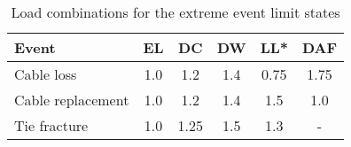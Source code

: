 \begin{table}[H]
\caption{Load combinations for the extreme event limit states}
\label{tab:extreme_combination}
\centering
\begin{tabular}{lccccc}
\hline
Event         & EL  & DC         & DW         & LL*   & DAF  \\ \hline
Cable loss   & 1.0 & 1.2 & 1.4 & 0.75 & 1.75   \\
Cable replacement & 1.0 & 1.2 & 1.4 & 1.5 & 1.0 \\ 
Tie fracture  & 1.0 & 1.25 & 1.5 & 1.3 & - \\ \hline
\end{tabular}
\end{table}
